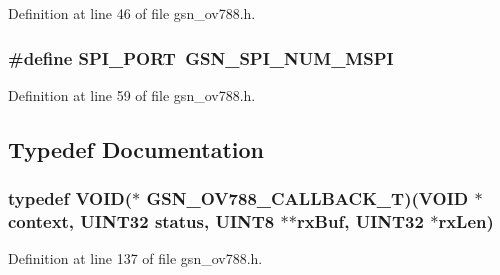 Definition at line 46 of file gsn\_\-ov788.h.

\hypertarget{a00537_a8112c985f7444e82198d7571ce0a9160}{
\subsubsection[{SPI\_\-PORT}]{\setlength{\rightskip}{0pt plus 5cm}\#define SPI\_\-PORT~GSN\_\-SPI\_\-NUM\_\-MSPI}}
\label{a00537_a8112c985f7444e82198d7571ce0a9160}


Definition at line 59 of file gsn\_\-ov788.h.



\subsection{Typedef Documentation}
\hypertarget{a00537_aaca340fbce9b168b056214ae64de57df}{
\subsubsection[{GSN\_\-OV788\_\-CALLBACK\_\-T}]{\setlength{\rightskip}{0pt plus 5cm}typedef VOID($\ast$ {\bf GSN\_\-OV788\_\-CALLBACK\_\-T})(VOID $\ast$context, {\bf UINT32} status, {\bf UINT8} $\ast$$\ast$rxBuf, {\bf UINT32} $\ast$rxLen)}}
\label{a00537_aaca340fbce9b168b056214ae64de57df}


Definition at line 137 of file gsn\_\-ov788.h.

